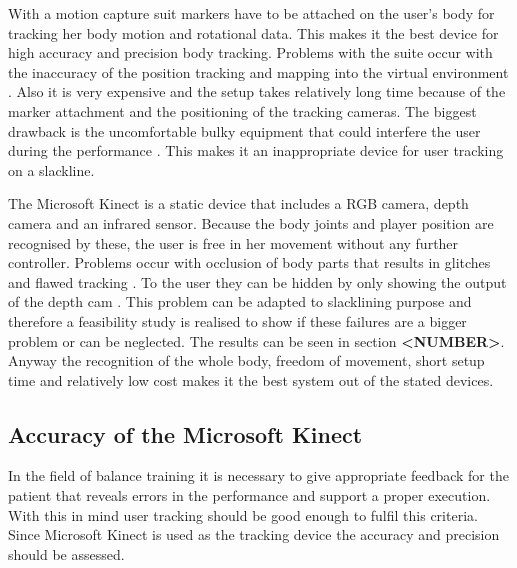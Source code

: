 With a motion capture suit markers have to be attached on the user’s body for tracking her body motion and rotational data. This makes it the best device for high accuracy and precision body tracking. Problems with the suite occur with the inaccuracy of the position tracking and mapping into the virtual environment \cite{Bogdanovych2015-ci} \cite{Nusman2006-rf}. Also it is very expensive and the setup takes relatively long time because of the marker attachment and the positioning of the tracking cameras. The biggest drawback is the uncomfortable bulky equipment that could interfere the user during the performance \cite{Chang2012-hz}. This makes it an inappropriate device for user tracking on a slackline.

The Microsoft Kinect is a static device that includes a RGB camera, depth camera and an infrared sensor. Because the body joints and player position are recognised by these, the user is free in her movement without any further controller. Problems occur with occlusion of body parts that results in glitches and flawed tracking \cite{Kajastila2014-ug} \cite{Tang2015-wt}. To the user they can be hidden by only showing the output of the depth cam \cite{Holsti2013-kn}. This problem can be adapted to slacklining purpose and therefore a feasibility study is realised to show if these failures are a bigger problem or can be neglected. The results can be seen in section \textbf{<NUMBER>}. Anyway the recognition of the whole body, freedom of movement, short setup time and relatively low cost makes it the best system out of the stated devices.

\subsection{Accuracy of the Microsoft Kinect}

In the field of balance training it is necessary to give appropriate feedback for the patient that reveals errors in the performance and support a proper execution. With this in mind user tracking should be good enough to fulfil this criteria. Since Microsoft Kinect is used as the tracking device the accuracy and precision should be assessed.


